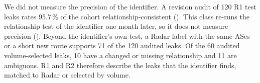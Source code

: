 We did not measure the precision of the identifier.
A revision audit of 120 R1 test leaks rates 95.7\,\% of the cohort relationship-consistent ().
This class re-runs the relationship test of the identifier one month later, so it does not measure precision ().
Beyond the identifier's own test, a Radar label with the same ASes or a short new route supports 71 of the 120 audited leaks.
Of the 60 audited volume-selected leaks, 10 have a changed or missing relationship and 11 are ambiguous.
R1 and R2 therefore describe the leaks that the identifier finds, matched to Radar or selected by volume.
